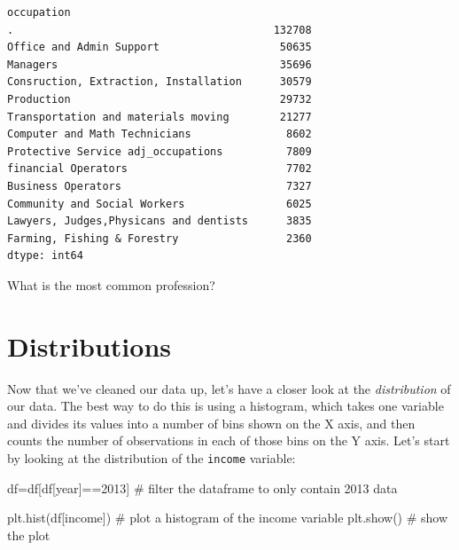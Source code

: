 \documentclass[
  letterpaper,
  DIV=11,
  numbers=noendperiod]{scrreprt}
\newenvironment{Shaded}{\begin{snugshade}}{\end{snugshade}}
\newcommand{\CommentTok}[1]{\textcolor[rgb]{0.37,0.37,0.37}{#1}}
\newcommand{\DecValTok}[1]{\textcolor[rgb]{0.68,0.00,0.00}{#1}}
\newcommand{\NormalTok}[1]{\textcolor[rgb]{0.00,0.23,0.31}{#1}}
\newcommand{\OperatorTok}[1]{\textcolor[rgb]{0.37,0.37,0.37}{#1}}
\newcommand{\StringTok}[1]{\textcolor[rgb]{0.13,0.47,0.30}{#1}}
\begin{document}
\begin{verbatim}
occupation
.                                         132708
Office and Admin Support                   50635
Managers                                   35696
Consruction, Extraction, Installation      30579
Production                                 29732
Transportation and materials moving        21277
Computer and Math Technicians               8602
Protective Service adj_occupations          7809
financial Operators                         7702
Business Operators                          7327
Community and Social Workers                6025
Lawyers, Judges,Physicans and dentists      3835
Farming, Fishing & Forestry                 2360
dtype: int64
\end{verbatim}

What is the most common profession?


\hypertarget{distributions}{%
\chapter{Distributions}\label{distributions}}

Now that we've cleaned our data up, let's have a closer look at the
\emph{distribution} of our data. The best way to do this is using a
histogram, which takes one variable and divides its values into a number
of bins shown on the X axis, and then counts the number of observations
in each of those bins on the Y axis. Let's start by looking at the
distribution of the \texttt{income} variable:

\begin{Shaded}
\begin{Highlighting}[]
\NormalTok{df}\OperatorTok{=}\NormalTok{df[df[}\StringTok{\textquotesingle{}year\textquotesingle{}}\NormalTok{]}\OperatorTok{==}\DecValTok{2013}\NormalTok{] }\CommentTok{\# filter the dataframe to only contain 2013 data}

\NormalTok{plt.hist(df[}\StringTok{\textquotesingle{}income\textquotesingle{}}\NormalTok{]) }\CommentTok{\# plot a histogram of the income variable}
\NormalTok{plt.show() }\CommentTok{\# show the plot}
\end{Highlighting}
\end{Shaded}
\end{document}
